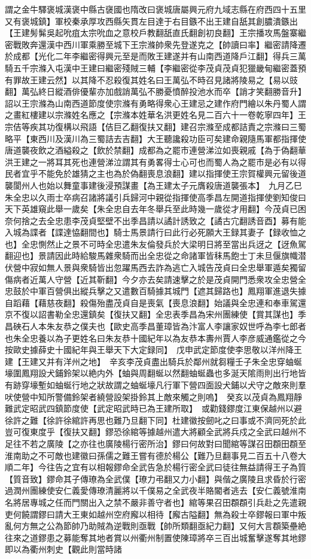 謂之金牛驛褒城漢褒中縣古襃國也隋改曰褒城唐屬興元府九域志縣在府西四十五里又有褒城鎮】軍校秦承厚攻西縣矢貫左目達于右目鏃不出王建自舐其創膿潰鏃出【王建髣髴吳起吮疽太宗吮血之意校戶教翻舐直氏翻創初良翻】王宗播攻馬盤寨繼密戰敗奔還漢中西川軍乘勝至城下王宗滌帥衆先登遂克之【帥讀曰率】繼密請降遷於成都【光化二年李繼密得興元至是而敗王建遂并有山南西道降戶江翻】得兵三萬騎五千宗滌入屯漢中王建曰繼密殘賊三輔【李繼密從李茂貞茂貞犯獵畿甸繼密蓋預有罪故王建云然】以其降不忍殺復其姓名曰王萬弘不時召見諸將陵易之【易以豉翻】萬弘終日縱酒俳優輩亦加戲誚萬弘不勝憂憤醉投池水而卒【誚才笑翻勝音升】詔以王宗滌為山南西道節度使宗滌有勇略得衆心王建忌之建作府門繪以朱丹蜀人謂之畫紅樓建以宗滌姓名應之【宗滌本姓華名洪更姓名見二百六十一卷乾寧四年】王宗佶等疾其功復構以飛語【佶巨乙翻復扶又翻】建召宗滌至成都詰責之宗滌曰三蜀略平【東西川及漢川為三蜀詰去吉翻】大王聽讒殺功臣可矣建命親隨馬軍都指揮使唐道襲夜飲之酒縊殺之【飲於禁翻】成都為之罷市連營涕泣如喪親戚【為于偽翻華洪王建之一將耳其死也連營涕泣謂其有勇畧得士心可也而蜀人為之罷市是必有以得民者宜乎不能免於雄猜之主也為於偽翻喪息浪翻】建以指揮使王宗賀權興元留後道襲閬州人也始以舞童事建後浸預謀畫【為王建太子元膺殺唐道襲張本】　九月乙巳朱全忠以久雨士卒病召諸將議引兵歸河中親從指揮使高季昌左開道指揮使劉知俊曰天下英雄窺此舉一歲矣【朱全忠自去年冬舉兵至此時幾一歲從才用翻】今茂貞已困奈何捨之去全忠患李茂貞堅壁不出季昌請以譎計誘致之【譎古宂翻誘音酉】募有能入城為諜者【諜達恊翻間也】騎士馬景請行曰此行必死願大王録其妻子【録收恤之也】全忠惻然止之景不可時全忠遣朱友倫發兵於大梁明日將至當出兵迓之【迓魚駕翻迎也】景請因此時給駿馬雜衆騎而出全忠從之命諸軍皆秣馬飽士丁未旦偃旗幟潜伏營中寂如無人景與衆騎皆出忽躍馬西去詐為逃亡入城告茂貞曰全忠舉軍遁矣獨留傷病者近萬人守營【近其靳翻】今夕亦去矣請速擊之於是茂貞開門悉衆攻全忠營全忠鼓於中軍百營俱出縱兵擊之又遣數百騎據其城門【遮其歸路也】鳳翔軍進退失據自蹈藉【藉慈夜翻】殺傷殆盡茂貞自是喪氣【喪息浪翻】始議與全忠連和奉車駕還京不復以詔書勒全忠還鎮矣【復扶又翻】全忠表季昌為宋州團練使【賞其謀也】季昌硤石人本朱友恭之僕夫也【歐史高季昌董璋皆為汴富人李讓家奴世呼為李七郎者也朱全忠養以為子更姓名曰朱友恭十國紀年以為友恭本夀州賈人李彦威通鑑從之今按歐史據薛史十國紀年與王舉天下大定録同】　戊申武定節度使李思敬以洋州降王建【王建又并有洋州之地】　辛亥李茂貞盡出騎兵於鄰州就芻糧壬子朱全忠穿蚰蜒壕圍鳳翔設犬鋪鈴架以絶内外【蚰與周翻蜒以然翻蚰蜒蟲也多涎天隂雨則出行地皆有跡穿壕塹如蚰蜒行地之狀故謂之蚰蜒壕凡行軍下營四面設犬鋪以犬守之敵來則羣吠使營中知所警備鈴架者繞營設架掛鈴其上敵來觸之則嗚】　癸亥以茂貞為鳳翔靜難武定昭武四鎮節度使【武定昭武時已為王建所取】　或勸錢鏐度江東保越州以避徐許之難【徐許徐綰許再思也難乃旦翻下同】杜建徽按劒叱之曰事或不濟同死於此豈可復東度乎【復扶又翻】鏐恐徐綰等據越州遣大將顧全武將兵戍之全武曰越州不足往不若之廣陵【之亦往也廣陵楊行密所治】鏐曰何故對曰聞綰等謀召田頵田頵至淮南助之不可敵也建徽曰孫儒之難王嘗有德於楊公【難乃旦翻事見二百五十八卷大順二年】今往告之宜有以相報鏐命全武告急於楊行密全武曰徒往無益請得王子為質【質音致】鏐命其子傳璙為全武僕【璙力弔翻又力小翻】與偕之廣陵且求昏於行密過潤州團練使安仁義愛傳璙清麗將以千僕易之全武夜半賂閽者逃去【安仁義號淮南名將居專城之任而門關出入之禁不嚴非善守者也】綰等果召田頵頵引兵赴之先遣親吏何饒謂鏐曰請大王東如越州空府廨以相待【廨古隘翻】無為殺士卒鏐報曰軍中叛亂何方無之公為節帥乃助賊為逆戰則亟戰【帥所類翻亟紀力翻】又何大言頵築壘絶往來之道鏐患之募能奪其地者賞以州衢州制置使陳璋將卒三百出城奮擊遂奪其地鏐即以為衢州刺史【觀此則當時諸